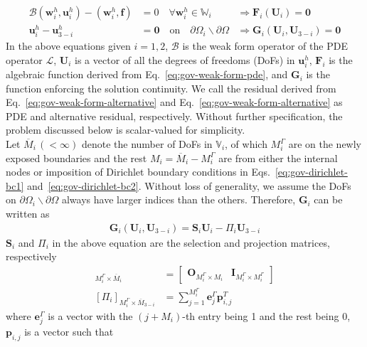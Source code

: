 \documentclass[preprint,12pt,sort&compress]{elsarticle}
\theoremstyle{definition}%
\begin{document}
\begin{align}%
  \mathcal{B}(\bm{w}^h_i, \bm{u}^h_i) - \left(\bm{w}^h_i, \bm{f}\right)
  &=0\quad\forall \bm{w}^h_i\in \mathbb{W}_i
  &\Rightarrow\bm{F}_i(\bm{U}_{i}) = \bm{0}\label{eq:gov-weak-form-pde}\\
  \bm{u}^h_i - \bm{u}^h_{3-i}
  &= \bm{0}\quad\text{on}\quad {\partial \Omega_i\backslash\partial \Omega}
  &\Rightarrow\bm{G}_i(\bm{U}_{i}, \bm{U}_{3-i}) = \bm{0}\label{eq:gov-weak-form-alternative}
\end{align}
In the above equations given $i=1, 2$, 
$\mathcal{B}$ is the weak form operator of the PDE operator $\mathcal{L}$, 
$\bm{U}_{i}$ is a vector of all the degrees of freedoms (DoFs) in $\bm{u}^h_i$, 
$\bm{F}_i$ is the algebraic function derived from Eq.~\ref{eq:gov-weak-form-pde}, 
and $\bm{G}_i$ is the function enforcing the solution continuity. 
We call the residual derived from Eq.~\ref{eq:gov-weak-form-alternative} and Eq.~\ref{eq:gov-weak-form-alternative} as PDE and alternative residual, respectively.
Without further specification, the problem discussed below is scalar-valued for simplicity.\\
Let $\overline{M}_i\,(<\infty)$ denote the number of DoFs in 
$\mathbb{V}_i$, of which ${M}^{\Gamma}_{i}$ are on the newly exposed boundaries and the rest 
$M_{i}=\overline{M}_i-M^{\Gamma}_{i}$ are from either the internal nodes or imposition of 
Dirichlet boundary conditions in Eqs.~\ref{eq:gov-dirichlet-bc1} and~\ref{eq:gov-dirichlet-bc2}. Without loss of generality, we assume the DoFs on 
$\partial\Omega_i\backslash\partial\Omega$ always have larger indices than the others. Therefore, $\bm{G}_i$ can be written as
\begin{align}
  \bm{G}_i(\bm{U}_{i}, \bm{U}_{3-i}) = \bm{S}_i\bm{U}_{i} - {\Pi}_i\bm{U}_{3-i}
\end{align}
$\bm{S}_i$ and ${\Pi}_i$ in the above equation are the selection and projection matrices, respectively
\begin{align}
  [\bm{S}_i]_{M^\Gamma_i\times \overline{M}_i}&=
  \begin{bmatrix}
    \bm{O}_{M^\Gamma_i\times M_i} & \bm{I}_{ M^\Gamma_i \times M^\Gamma_i}
  \end{bmatrix}\\
  [{\Pi}_i]_{M^\Gamma_i \times \overline{M}_{3-i}}&=
  \sum_{j=1}^{M^\Gamma_i}\bm{e}^\Gamma_{j} \bm{p}_{i,j}^T
\end{align}
where $\bm{e}^\Gamma_{j}$ is a vector with the $(j+M_i)$-th entry being 1 and the rest being 0, $\bm{p}_{i,j}$ is a vector such that 
\end{document}
